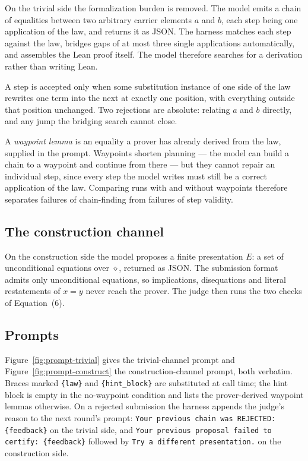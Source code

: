 \documentclass[letterpaper]{article}
\newcommand{\op}{\diamond}
\begin{document}
On the trivial side the formalization burden is removed. The model emits a
chain of equalities between two arbitrary carrier elements $a$ and $b$, each
step being one application of the law, and returns it as JSON. The harness
matches each step against the law, bridges gaps of at most three single
applications automatically, and assembles the Lean proof itself. The model
therefore searches for a derivation rather than writing Lean.

A step is accepted only when some substitution instance of one side of the law
rewrites one term into the next at exactly one position, with everything
outside that position unchanged. Two rejections are absolute: relating $a$ and
$b$ directly, and any jump the bridging search cannot close.

A \emph{waypoint lemma} is an equality a prover has already derived from the
law, supplied in the prompt. Waypoints shorten planning --- the model can build
a chain to a waypoint and continue from there --- but they cannot repair an
individual step, since every step the model writes must still be a correct
application of the law. Comparing runs with and without waypoints therefore
separates failures of chain-finding from failures of step validity.

\subsection{The construction channel}

On the construction side the model proposes a finite presentation $E$: a set of
unconditional equations over $\op$, returned as JSON. The submission format
admits only unconditional equations, so implications, disequations and literal
restatements of $x = y$ never reach the prover. The judge then runs the two
checks of Equation~(6).

\subsection{Prompts}

Figure~\ref{fig:prompt-trivial} gives the trivial-channel prompt and
Figure~\ref{fig:prompt-construct} the construction-channel prompt, both
verbatim. Braces marked \texttt{\{law\}} and \texttt{\{hint\_block\}} are
substituted at call time; the hint block is empty in the no-waypoint condition
and lists the prover-derived waypoint lemmas otherwise. On a rejected
submission the harness appends the judge's reason to the next round's prompt:
\texttt{Your previous chain was REJECTED: \{feedback\}} on the trivial side,
and \texttt{Your previous proposal failed to certify: \{feedback\}} followed by
\texttt{Try a different presentation.} on the construction side.
\end{document}
